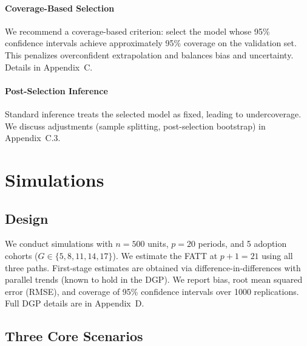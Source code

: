 \documentclass{article}
\begin{document}
\paragraph{Coverage-Based Selection}


We recommend a coverage-based criterion: select the model whose 95\% confidence intervals achieve approximately 95\% coverage on the validation set. This penalizes overconfident extrapolation and balances bias and uncertainty. Details in Appendix~C.

\paragraph{Post-Selection Inference}


Standard inference treats the selected model as fixed, leading to undercoverage. We discuss adjustments (sample splitting, post-selection bootstrap) in Appendix~C.3.


\section{Simulations}
\label{sec:simulations}


\subsection{Design}


We conduct simulations with $n = 500$ units, $p = 20$ periods, and 5 adoption cohorts ($G \in \{5, 8, 11, 14, 17\}$). We estimate the FATT at $p+1 = 21$ using all three paths. First-stage estimates are obtained via difference-in-differences with parallel trends (known to hold in the DGP). We report bias, root mean squared error (RMSE), and coverage of 95\% confidence intervals over 1000 replications. Full DGP details are in Appendix~D.

\subsection{Three Core Scenarios}
\end{document}
